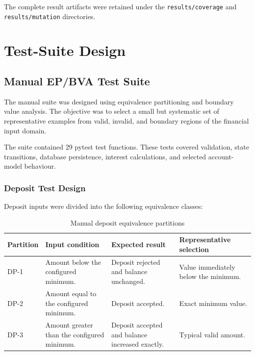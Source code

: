 \documentclass[12pt]{article}
\begin{document}
The complete result artifacts were retained under the
\texttt{results/coverage} and \texttt{results/mutation} directories.


\section{Test-Suite Design}

\subsection{Manual EP/BVA Test Suite}

The manual suite was designed using equivalence partitioning and boundary
value analysis. The objective was to select a small but systematic set of
representative examples from valid, invalid, and boundary regions of the
financial input domain.

The suite contained 29 pytest test functions. These tests covered validation,
state transitions, database persistence, interest calculations, and selected
account-model behaviour.

\subsubsection{Deposit Test Design}

Deposit inputs were divided into the following equivalence classes:

\begin{table}[H]
\centering
\caption{Manual deposit equivalence partitions}
\label{tab:manual-deposit-partitions}
\begin{tabular}{|p{2.2cm}|p{4.2cm}|p{4.2cm}|p{3cm}|}
\hline
\textbf{Partition} &
\textbf{Input condition} &
\textbf{Expected result} &
\textbf{Representative selection} \\
\hline

DP-1 &
Amount below the configured minimum. &
Deposit rejected and balance unchanged. &
Value immediately below the minimum. \\
\hline

DP-2 &
Amount equal to the configured minimum. &
Deposit accepted. &
Exact minimum value. \\
\hline

DP-3 &
Amount greater than the configured minimum. &
Deposit accepted and balance increased exactly. &
Typical valid amount. \\
\hline

\end{tabular}
\end{table}
\end{document}
